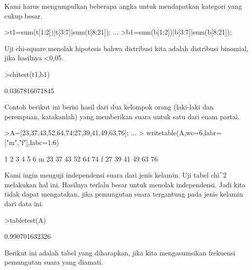 \documentclass[a4paper,10pt]{article}
\begin{document}
\begin{eulernotebook}
\begin{eulercomment}
\begin{eulercomment}
\begin{eulercomment}
\begin{eulercomment}
\begin{eulercomment}
\begin{eulercomment}
\begin{eulercomment}
\begin{eulercomment}
\begin{eulercomment}
\begin{eulercomment}
\begin{eulercomment}
\begin{eulercomment}
\begin{eulercomment}
\begin{eulercomment}
\begin{eulercomment}
\begin{eulercomment}
\begin{eulercomment}
\begin{eulercomment}
\begin{eulercomment}
Kami harus mengumpulkan beberapa angka untuk mendapatkan kategori yang
cukup besar.
\end{eulercomment}
\begin{eulerprompt}
>t1=sum(t[1:2])|t[3:7]|sum(t[8:21]); ...
>b1=sum(b[1:2])|b[3:7]|sum(b[8:21]);
\end{eulerprompt}
\begin{eulercomment}
Uji chi-square menolak hipotesis bahwa distribusi kita adalah
distribusi binomial, jika hasilnya \textless{}0,05.
\end{eulercomment}
\begin{eulerprompt}
>chitest(t1,b1)
\end{eulerprompt}
\begin{euleroutput}
  0.0367816071845
\end{euleroutput}
\begin{eulercomment}
Contoh berikut ini berisi hasil dari dua kelompok orang (laki-laki dan
perempuan, katakanlah) yang memberikan suara untuk satu dari enam
partai.
\end{eulercomment}
\begin{eulerprompt}
>A=[23,37,43,52,64,74;27,39,41,49,63,76];  ...
>  writetable(A,wc=6,labr=["m","f"],labc=1:6)
\end{eulerprompt}
\begin{euleroutput}
             1     2     3     4     5     6
       m    23    37    43    52    64    74
       f    27    39    41    49    63    76
\end{euleroutput}
\begin{eulercomment}
Kami ingin menguji independensi suara dari jenis kelamin. Uji tabel
chi\textasciicircum{}2 melakukan hal ini. Hasilnya terlalu besar untuk menolak
independensi. Jadi kita tidak dapat mengatakan, jika pemungutan suara
tergantung pada jenis kelamin dari data ini.
\end{eulercomment}
\begin{eulerprompt}
>tabletest(A)
\end{eulerprompt}
\begin{euleroutput}
  0.990701632326
\end{euleroutput}
\begin{eulercomment}
Berikut ini adalah tabel yang diharapkan, jika kita mengasumsikan
frekuensi pemungutan suara yang diamati.
\end{eulercomment}
\begin{eulerprompt}

\end{eulerprompt}
\end{eulercomment}
\end{eulercomment}
\end{eulercomment}
\end{eulercomment}
\end{eulercomment}
\end{eulercomment}
\end{eulercomment}
\end{eulercomment}
\end{eulercomment}
\end{eulercomment}
\end{eulercomment}
\end{eulercomment}
\end{eulercomment}
\end{eulercomment}
\end{eulercomment}
\end{eulercomment}
\end{eulercomment}
\end{eulercomment}
\end{eulernotebook}
\end{document}
